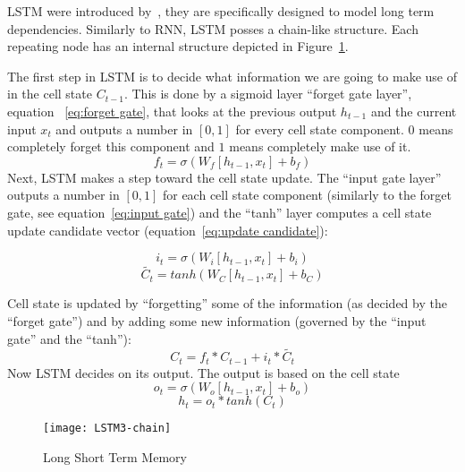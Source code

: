 LSTM were introduced by~\cite{hochreiter1997long}, they are
specifically designed to model long term dependencies. Similarly to
RNN, LSTM posses a chain-like structure. Each repeating node has an
internal structure depicted in Figure~\ref{fig:lstm1}.

The first step in LSTM is to decide what information we are going to
make use of in the cell state $C_{t-1}$.  This is done by a sigmoid
layer ``forget gate layer'', equation ~\ref{eq:forget gate}, that
looks at the previous output $h_{t-1}$ and the current input $x_t$ and
outputs a number in $[0,1]$ for every cell state component. $0$ means
completely forget this component and $1$ means completely make use of
it.
\begin{equation}\label{eq:forget gate}
  f_t = \sigma(W_f[h_{t-1}, x_t] + b_f)
\end{equation}
Next, LSTM makes a step toward the cell state update. The ``input gate
layer'' outputs a number in $[0,1]$ for each cell state component
(similarly to the forget gate, see equation~\ref{eq:input gate}) and
the ``tanh'' layer computes a cell state update candidate vector
(equation~\ref{eq:update candidate}):

\begin{equation}\label{eq:input gate}
  i_t = \sigma(W_i[h_{t-1},x_t] + b_i)
\end{equation}
\begin{equation}\label{eq:update candidate}
  \tilde{C_t} = tanh(W_C[h_{t-1},x_t] + b_C)
\end{equation}

Cell state is updated by ``forgetting'' some of the information (as
decided by the ``forget gate'') and by adding some new information
(governed by the ``input gate'' and the ``tanh''):
\begin{equation}
  C_t = f_t*C_{t-1}+i_t*\tilde{C_t}
\end{equation}
Now LSTM decides on its output.  The output is based on the cell state
\begin{equation}
  o_t = \sigma(W_o[h_{t-1},x_t]+b_o)
\end{equation}
\begin{equation}
  h_t = o_t*tanh(C_t)
\end{equation}

\begin{figure}[ht!]
  \centering \texttt{[image: LSTM3-chain]}
  \caption{Long Short Term Memory}\label{fig:lstm1}
\end{figure}

